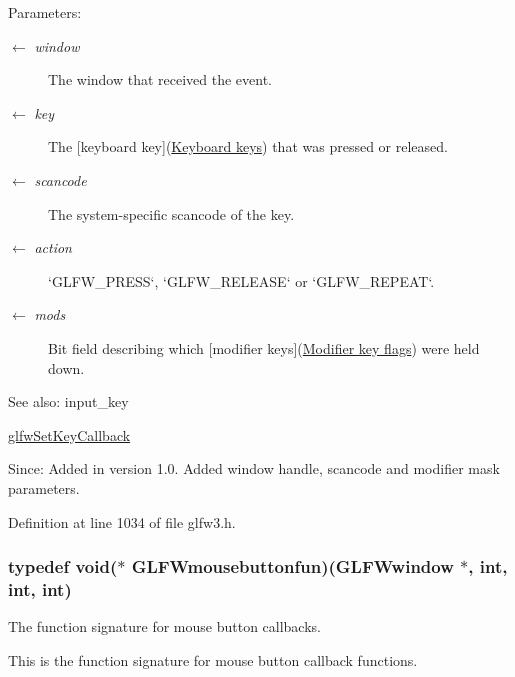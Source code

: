\begin{Desc}
\item[Parameters:]
\begin{description}
\item[\mbox{$\leftarrow$} {\em window}]The window that received the event. \item[\mbox{$\leftarrow$} {\em key}]The \mbox{[}keyboard key\mbox{]}(\hyperlink{group__keys}{Keyboard keys}) that was pressed or released. \item[\mbox{$\leftarrow$} {\em scancode}]The system-specific scancode of the key. \item[\mbox{$\leftarrow$} {\em action}]`GLFW\_\-PRESS`, `GLFW\_\-RELEASE` or `GLFW\_\-REPEAT`. \item[\mbox{$\leftarrow$} {\em mods}]Bit field describing which \mbox{[}modifier keys\mbox{]}(\hyperlink{group__mods}{Modifier key flags}) were held down.\end{description}
\end{Desc}
\begin{Desc}
\item[See also:]input\_\-key 

\hyperlink{group__input_ga73bb92f628a2a0be9c132d56f19362c}{glfwSetKeyCallback}\end{Desc}
\begin{Desc}
\item[Since:]Added in version 1.0.  Added window handle, scancode and modifier mask parameters. \end{Desc}


Definition at line 1034 of file glfw3.h.\hypertarget{group__input_g1e008c7a8751cea648c8f42cc91104cf}{
\subsubsection[GLFWmousebuttonfun]{\setlength{\rightskip}{0pt plus 5cm}typedef void($\ast$  {\bf GLFWmousebuttonfun})({\bf GLFWwindow} $\ast$, int, int, int)}}
\label{group__input_g1e008c7a8751cea648c8f42cc91104cf}


The function signature for mouse button callbacks. 

This is the function signature for mouse button callback functions.

